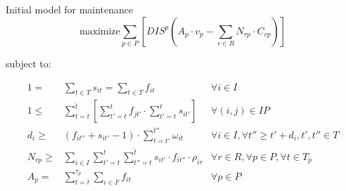 \documentclass{beamer}
\begin{document}
\begin{frame}{Initial model for maintenance}
\footnotesize
\begin{equation}
	\text{maximize} \sum_{p \in P} [ DIS^p (A_p \cdot v_p - \sum_{r \in R} N_{rp} \cdot C_{rp}) ]
\end{equation}

\bigskip
subject to:

\begin{align}
1 =& \sum_{t \in T} s_{it}	= \sum_{t \in T} f_{it}										&	\forall i \in I 						\\
1 \leq& \sum_{t = \dot{t}}^{\hat{t}} [ \sum_{t' = \dot{t}}^t f_{jt'} \cdot \sum_{t' = t}^{\hat{t}} s_{it'} ]	&	\forall (i, j) \in IP					\\
d_i \geq& (f_{it''} + s_{it'} - 1) \cdot \sum_{t = t'}^{t''} \omega_{it} 							& 	\forall i \in I, 	\forall t'' \geq t' + d_i, t', t'' \in T	\\
N_{rp} \geq& \sum_{i\in I} \sum_{t' = \dot{t}}^t \sum_{t'' = t}^{\hat{t}} s_{it'} \cdot f_{it''} \cdot \rho_{ir}	& 	\forall r \in R, \forall p \in P, \forall t \in T_p 	\\
A_p =&  \sum_{ t = \dot{t}}^{\tau_p} \sum_{i \in F} f_{it}									&	\forall p \in P
\end{align}

\end{frame}
\end{document}
